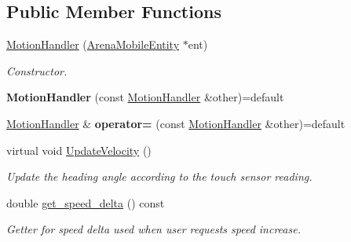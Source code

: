 \subsection*{Public Member Functions}
\begin{DoxyCompactItemize}
\item 
\mbox{\label{class_motion_handler_a48c0070bfda6acb8a7493eb7fe1200c4}} 
\mbox{\hyperlink{class_motion_handler_a48c0070bfda6acb8a7493eb7fe1200c4}{Motion\+Handler}} (\mbox{\hyperlink{class_arena_mobile_entity}{Arena\+Mobile\+Entity}} $\ast$ent)
\begin{DoxyCompactList}\small\item\em Constructor. \end{DoxyCompactList}\item 
\mbox{\label{class_motion_handler_a91dc98beab9d5ccce6b6c18ce32c0488}} 
{\bfseries Motion\+Handler} (const \mbox{\hyperlink{class_motion_handler}{Motion\+Handler}} \&other)=default
\item 
\mbox{\label{class_motion_handler_ad45188f2d9794fd2b257d586a7b522e6}} 
\mbox{\hyperlink{class_motion_handler}{Motion\+Handler}} \& {\bfseries operator=} (const \mbox{\hyperlink{class_motion_handler}{Motion\+Handler}} \&other)=default
\item 
\mbox{\label{class_motion_handler_a44b092d9627f25f57c50ec8886d0bc29}} 
virtual void \mbox{\hyperlink{class_motion_handler_a44b092d9627f25f57c50ec8886d0bc29}{Update\+Velocity}} ()
\begin{DoxyCompactList}\small\item\em Update the heading angle according to the touch sensor reading. \end{DoxyCompactList}\item 
\mbox{\label{class_motion_handler_ada53f0d6e25d759fc3f45cc55d440177}} 
double \mbox{\hyperlink{class_motion_handler_ada53f0d6e25d759fc3f45cc55d440177}{get\+\_\+speed\+\_\+delta}} () const
\begin{DoxyCompactList}\small\item\em Getter for speed delta used when user requests speed increase. \end{DoxyCompactList}\item 
\mbox{\label{class_motion_handler_a908b330346b3fe969684106bd5c7619d}} 

\end{DoxyCompactItemize}
